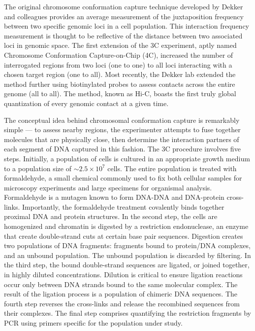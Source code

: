 The original chromosome conformation capture technique developed by Dekker and
colleagues provides an average measurement of the juxtaposition frequency between
two specific genomic loci in a cell population\cite{frase2014}.  This
interaction frequency measurement is thought to be reflective of the distance
between two associated loci in genomic space.  The first extension of the 3C
experiment, aptly named Chromosome Conformation Capture-on-Chip (4C), increased
the number of interrogated regions from two loci (one to one) to all loci
interacting with a chosen target region (one to all)\cite{simonis2006}.  Most
recently, the Dekker lab extended the method further using biotinylated probes
to assess contacts across the entire genome (all to all)\cite{berkum2010}.
The method, known as Hi-C, boasts the first truly global quantization of every
genomic contact at a given time.

The conceptual idea behind chromosomal conformation capture is remarkably
simple --- to assess nearby regions, the experimenter attempts to fuse
together molecules that are physically close, then determine the interaction
partners of each segment of DNA captured in this fashion.  The 3C procedure
involves five steps.   Initially, a population of cells is cultured in an appropriate
growth medium to a population size of $\sim2.5 \times 10^7$ cells\cite{berkum2010}.
The entire population is treated with formaldehyde, a small chemical commonly
used to fix both cellular samples for microscopy experiments and large specimens
for organismal analysis.  Formaldehyde is a mutagen known to form DNA-DNA and
DNA-protein cross-links\cite{merk1998}.  Importantly, the formaldehyde
treatment covalently binds together proximal DNA and protein structures.
In the second step, the cells are homogenized and chromatin is digested by a
restriction endonuclease, an enzyme that create double-strand cuts at certain
base pair sequences\cite{berkum2010}.  Digestion creates two populations of
DNA fragments: fragments bound to protein/DNA complexes, and an unbound
population.  The unbound population is discarded by filtering.  In the
third step, the bound double-strand sequences are ligated, or joined together,
in highly diluted concentrations. Dilution is critical to ensure ligation
reactions occur only between DNA strands bound to the same molecular complex.
The result of the ligation process is a population of chimeric DNA sequences.
The fourth step reverses the cross-links and release the recombined sequences
from their complexes.  The final step comprises quantifying the restriction
fragments by PCR using primers specific for the population under
study\cite{simonis2007}.

